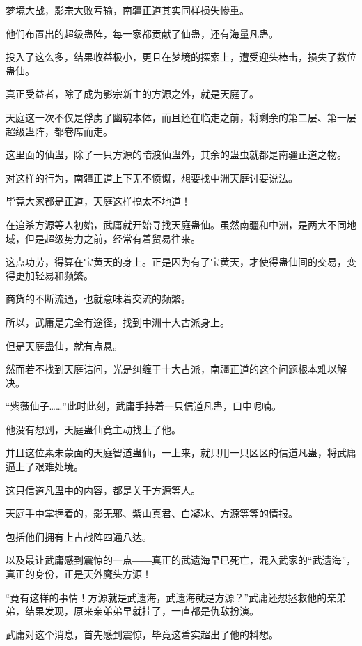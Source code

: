 
\begin{this_body}

梦境大战，影宗大败亏输，南疆正道其实同样损失惨重。

他们布置出的超级蛊阵，每一家都贡献了仙蛊，还有海量凡蛊。

投入了这么多，结果收益极小，更且在梦境的探索上，遭受迎头棒击，损失了数位蛊仙。

真正受益者，除了成为影宗新主的方源之外，就是天庭了。

天庭这一次不仅是俘虏了幽魂本体，而且还在临走之前，将剩余的第二层、第一层超级蛊阵，都卷席而走。

这里面的仙蛊，除了一只方源的暗渡仙蛊外，其余的蛊虫就都是南疆正道之物。

对这样的行为，南疆正道上下无不愤慨，想要找中洲天庭讨要说法。

毕竟大家都是正道，天庭这样搞太不地道！

在追杀方源等人初始，武庸就开始寻找天庭蛊仙。虽然南疆和中洲，是两大不同地域，但是超级势力之前，经常有着贸易往来。

这点功劳，得算在宝黄天的身上。正是因为有了宝黄天，才使得蛊仙间的交易，变得更加轻易和频繁。

商货的不断流通，也就意味着交流的频繁。

所以，武庸是完全有途径，找到中洲十大古派身上。

但是天庭蛊仙，就有点悬。

然而若不找到天庭诘问，光是纠缠于十大古派，南疆正道的这个问题根本难以解决。

“紫薇仙子……”此时此刻，武庸手持着一只信道凡蛊，口中呢喃。

他没有想到，天庭蛊仙竟主动找上了他。

并且这位素未蒙面的天庭智道蛊仙，一上来，就只用一只区区的信道凡蛊，将武庸逼上了艰难处境。

这只信道凡蛊中的内容，都是关于方源等人。

天庭手中掌握着的，影无邪、紫山真君、白凝冰、方源等等的情报。

包括他们拥有上古战阵四通八达。

以及最让武庸感到震惊的一点――真正的武遗海早已死亡，混入武家的“武遗海”，真正的身份，正是天外魔头方源！

“竟有这样的事情！方源就是武遗海，武遗海就是方源？”武庸还想拯救他的亲弟弟，结果发现，原来亲弟弟早就挂了，一直都是仇敌扮演。

武庸对这个消息，首先感到震惊，毕竟这着实超出了他的料想。


\end{this_body}
